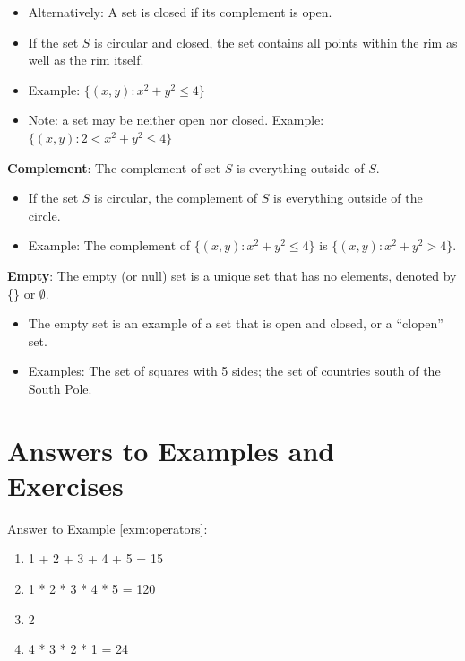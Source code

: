 \documentclass[]{book}
\providecommand{\tightlist}{%
  \setlength{\itemsep}{0pt}\setlength{\parskip}{0pt}}
\theoremstyle{definition}
\theoremstyle{definition}
\theoremstyle{definition}
\theoremstyle{remark}
\begin{document}
\begin{itemize}
\tightlist
\item
  Alternatively: A set is closed if its complement is open.
\item
  If the set \(S\) is circular and closed, the set contains all points within the rim as well as the rim itself.
\item
  Example: \(\{ (x,y) : x^2+y^2\le 4 \}\)
\item
  Note: a set may be neither open nor closed. Example: \(\{ (x,y) : 2 < x^2+y^2\le 4 \}\)
\end{itemize}

\textbf{Complement}: The complement of set \(S\) is everything outside of \(S\).

\begin{itemize}
\tightlist
\item
  If the set \(S\) is circular, the complement of \(S\) is everything outside of the circle.
\item
  Example: The complement of \(\{ (x,y) : x^2+y^2\le 4 \}\) is \(\{ (x,y) : x^2+y^2 > 4 \}\).
\end{itemize}

\textbf{Empty}: The empty (or null) set is a unique set that has no elements, denoted by \{\} or \(\emptyset\).

\begin{itemize}
\tightlist
\item
  The empty set is an example of a set that is open and closed, or a ``clopen'' set.
\item
  Examples: The set of squares with 5 sides; the set of countries south of the South Pole.
\end{itemize}

\hypertarget{answers-to-examples-and-exercises}{%
\section*{Answers to Examples and Exercises}\label{answers-to-examples-and-exercises}}

Answer to Example \ref{exm:operators}:

\begin{enumerate}
\def\labelenumi{\arabic{enumi}.}
\item
  1 + 2 + 3 + 4 + 5 = 15
\item
  1 * 2 * 3 * 4 * 5 = 120
\item
  2
\item
  4 * 3 * 2 * 1 = 24
\end{enumerate}
\end{document}
